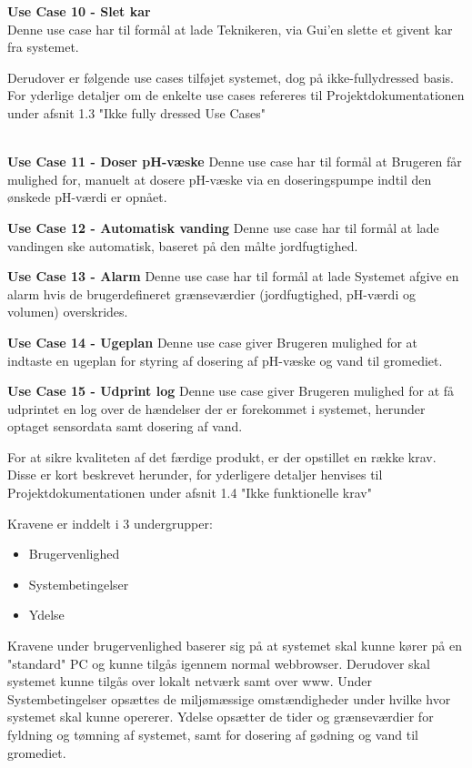 \textbf{Use Case 10 - Slet kar} \\
Denne use case har til formål at lade Teknikeren, via Gui'en slette et givent kar fra systemet.\newline


Derudover er følgende use cases tilføjet systemet, dog på ikke-fullydressed basis. For yderlige detaljer om de enkelte use cases refereres til Projektdokumentationen under afsnit 1.3 "Ikke fully dressed Use Cases"\\\

\textbf{Use Case 11 - Doser pH-væske}
Denne use case har til formål at Brugeren får mulighed for, manuelt at dosere pH-væske via en doseringspumpe indtil den
ønskede pH-værdi er opnået.\newline

\textbf{Use Case 12 - Automatisk vanding} 
Denne use case har til formål at lade vandingen ske automatisk, baseret på den målte jordfugtighed.\newline

\textbf{Use Case 13 - Alarm} 
Denne use case har til formål at lade Systemet afgive en alarm hvis de brugerdefineret grænseværdier (jordfugtighed, pH-værdi og volumen) overskrides.\newline

\textbf{Use Case 14 - Ugeplan} 
Denne use case giver Brugeren mulighed for at indtaste en ugeplan for styring af dosering af pH-væske
og vand til gromediet.\newline

\textbf{Use Case 15 - Udprint log} 
Denne use case giver Brugeren mulighed for at få udprintet en log over de hændelser der er forekommet i systemet, herunder optaget sensordata samt dosering af vand.\newline


For at sikre kvaliteten af det færdige produkt, er der opstillet en række krav. Disse er kort beskrevet herunder, for yderligere detaljer henvises til Projektdokumentationen under afsnit 1.4 "Ikke funktionelle krav"

Kravene er inddelt i 3 undergrupper: 

\begin{itemize}
	\item	Brugervenlighed
	\item	Systembetingelser
	\item	Ydelse
\end{itemize}

Kravene under brugervenlighed baserer sig på at systemet skal kunne kører på en "standard" PC og kunne tilgås igennem normal webbrowser. Derudover skal systemet kunne tilgås over lokalt netværk samt over www.\newline
Under Systembetingelser opsættes de miljømæssige omstændigheder under hvilke hvor systemet skal kunne opererer.\newline 
Ydelse opsætter de tider og grænseværdier for fyldning og tømning af systemet, samt for dosering af gødning og vand til gromediet.